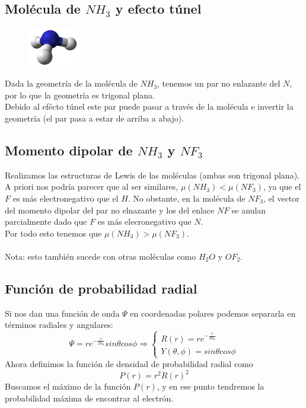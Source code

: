 \documentclass[12pt]{article}
\begin{document}
	\subsection{Molécula de $NH_3$ y efecto túnel}
	\begin{figure}
    	\centering
    	\includegraphics[width=0.20\textwidth]{nh3}
	\end{figure}
	Dada la geometría de la molécula de $NH_3$, tenemos un par no enlazante del $N$, por lo que la geometría es trigonal plana. \\
	Debido al efécto túnel este par puede pasar a través de la molécula e invertir la geometría (el par pasa a estar de arriba a abajo). \\
	
	\subsection{Momento dipolar de $NH_3$ y $NF_3$}
	Realizamos las estructuras de Lewis de las moléculas (ambas son trigonal plana). A priori nos podría parecer que al ser similares, $\mu(NH_3)<\mu(NF_3)$, ya que el $F$ es más electronegativo que el $H$. No obstante, en la molécula de $NF_3$, el vector del momento dipolar del par no elnazante y los del enlace $NF$ se anulan parcialmente dado que $F$ es más elecronegativo que $N$.\\
	Por todo esto tenemos que $\mu(NH_3)>\mu(NF_3)$. \\
	\\
	Nota: esto también sucede con otras moléculas como $H_2O$ y $OF_2$.
	
	\subsection{Función de probabilidad radial}
	Si nos dan una función de onda $\Psi$ en coordenadas polares podemos separarla en términos radiales y angulares:
	\[\Psi = re^{-\frac{r}{2a_0}}sin\theta cos\phi \Rightarrow \begin{cases} R(r)=re^{-\frac{r}{2a_0}} \\ Y(\theta, \phi) = sin\theta cos\phi \end{cases}\]
	Ahora definimos la función de densidad de probabilidad radial como
	\[P(r) = r^2R(r)^2\]
	Buscamos el máximo de la función $P(r)$, y en ese punto tendremos la probabilidad máxima de encontrar al electrón.
	
\end{document}
